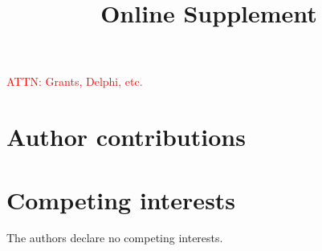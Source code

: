 \documentclass{article}
\newcommand{\beginsupplement}{
  \setcounter{table}{0}  
  \renewcommand{\thetable}{S\arabic{table}} 
  \setcounter{figure}{0} 
  \renewcommand{\thefigure}{S\arabic{figure}}
  \setcounter{section}{0} 
  \renewcommand{\thesection}{S\arabic{section}}
}
\newcommand{\attn }[1]{\textcolor{red}{ATTN: #1}}
\begin{document}
\attn{Grants, Delphi, etc.}

\section*{Author contributions}

\section*{Competing interests}

The authors declare no competing interests.





\clearpage
\beginsupplement
\title{\supptitlefont Online Supplement}
\maketitle


\end{document}
